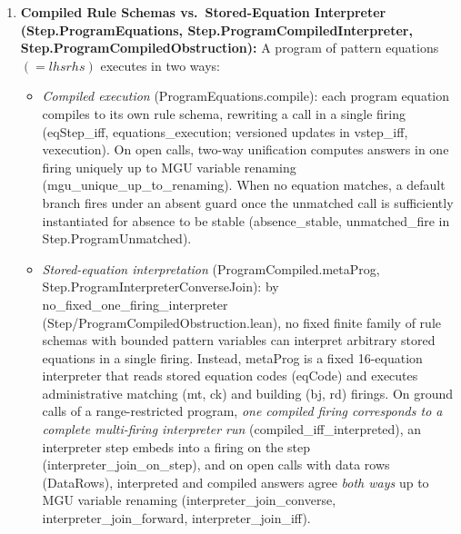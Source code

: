\documentclass[11pt,a4paper]{article}
\theoremstyle{definition}
\DeclareRobustCommand{\lean}[1]{%
  \ifmmode\text{\normalfont\ttfamily\footnotesize\detokenize{#1}}%
  \else{\normalfont\footnotesize\leanurl{#1}}\fi}
\DeclareRobustCommand{\metta}[1]{\text{\normalfont\ttfamily\footnotesize #1}}
\def\lean#1{#1}%
\def\metta#1{#1}%
\begin{document}
\begin{enumerate}[leftmargin=2em, nosep]
  \item \textbf{Compiled Rule Schemas vs.\ Stored-Equation Interpreter (\lean{Step.ProgramEquations}, \lean{Step.ProgramCompiledInterpreter}, \lean{Step.ProgramCompiledObstruction}):}
  A program of pattern equations $\metta{(= lhs rhs)}$ executes in two ways:
  \begin{itemize}[nosep]
    \item \emph{Compiled execution} (\lean{ProgramEquations.compile}): each program equation compiles to its own rule schema, rewriting a call in a single firing (\lean{eqStep_iff}, \lean{equations_execution}; versioned updates in \lean{vstep_iff}, \lean{vexecution}). On open calls, two-way unification computes answers in one firing uniquely up to MGU variable renaming~\cite{Eder1985Properties} (\lean{mgu_unique_up_to_renaming}). When no equation matches, a default branch fires under an \metta{absent} guard once the unmatched call is sufficiently instantiated for absence to be stable (\lean{absence_stable}, \lean{unmatched_fire} in \lean{Step.ProgramUnmatched}).
    \item \emph{Stored-equation interpretation} (\lean{ProgramCompiled.metaProg}, \lean{Step.ProgramInterpreterConverseJoin}): by \lean{no_fixed_one_firing_interpreter} (\lean{Step/ProgramCompiledObstruction.lean}), no fixed finite family of rule schemas with bounded pattern variables can interpret arbitrary stored equations in a single firing. Instead, \lean{metaProg} is a fixed 16-equation interpreter that reads stored equation codes (\lean{eqCode}) and executes administrative matching (\metta{mt}, \metta{ck}) and building (\metta{bj}, \metta{rd}) firings. On ground calls of a range-restricted program, \emph{one compiled firing corresponds to a complete multi-firing interpreter run} (\lean{compiled_iff_interpreted}), an interpreter step embeds into a firing on the step (\lean{interpreter_join_on_step}), and on open calls with data rows (\lean{DataRows}), interpreted and compiled answers agree \emph{both ways} up to MGU variable renaming (\lean{interpreter_join_converse}, \lean{interpreter_join_forward}, \lean{interpreter_join_iff}).
  \end{itemize}


\end{enumerate}
\end{document}

